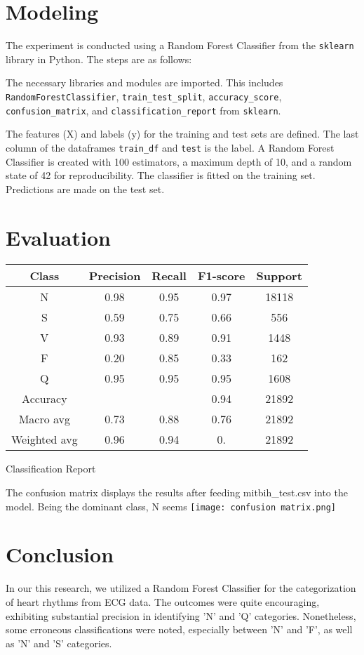 \documentclass{article}
\begin{document}
\begin{multicols}{2}
\section{Modeling}
The experiment is conducted using a Random Forest Classifier from the \texttt{sklearn} library in Python. The steps are as follows:

The necessary libraries and modules are imported. This includes \texttt{RandomForestClassifier}, \texttt{train\_test\_split}, \texttt{accuracy\_score}, \texttt{confusion\_matrix}, and \texttt{classification\_report} from \texttt{sklearn}.

The features (X) and labels (y) for the training and test sets are defined. The last column of the dataframes \texttt{train\_df} and \texttt{test} is the label. A Random Forest Classifier is created with 100 estimators, a maximum depth of 10, and a random state of 42 for reproducibility. The classifier is fitted on the training set. Predictions are made on the test set. 

\section{Evaluation}
\begin{tabular}{c|c c c c}
\hline
Class & Precision & Recall & F1-score & Support \\ \hline
N & 0.98 & 0.95 & 0.97 & 18118 \\
S & 0.59 & 0.75 & 0.66 & 556 \\ 
V & 0.93 & 0.89 & 0.91 & 1448 \\ 
F & 0.20 & 0.85 & 0.33 & 162 \\ 
Q & 0.95 & 0.95 & 0.95 & 1608 \\ \hline
\multicolumn{1}{c|}{Accuracy} & & & 0.94 & 21892 \\
\multicolumn{1}{c|}{Macro avg} & 0.73 & 0.88 & 0.76 & 21892 \\
\multicolumn{1}{c|}{Weighted avg} & 0.96 & 0.94 & 0. & 21892\\ \hline
\end{tabular}
\caption{Classification Report}
\label{table:classification_report}

The confusion matrix displays the results after feeding mitbih\_test.csv into the model. Being the dominant class, N seems  
\texttt{[image: confusion matrix.png]}
    \label{fig:confusion matrix}
\section{Conclusion}
In our this research, we utilized a Random Forest Classifier for the categorization of heart rhythms from ECG data. The outcomes were quite encouraging, exhibiting substantial precision in identifying 'N' and 'Q' categories. Nonetheless, some erroneous classifications were noted, especially between 'N' and 'F', as well as 'N' and 'S' categories.


\end{multicols}
\end{document}
